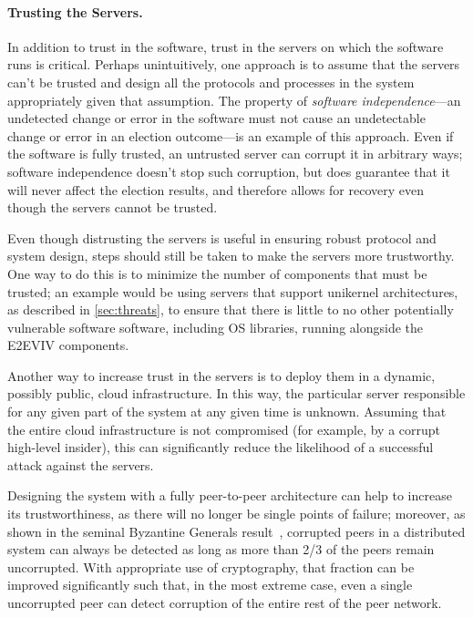 \paragraph{Trusting the Servers.} In addition to trust in the
software, trust in the servers on which the software runs is
critical. Perhaps unintuitively, one approach is to assume that the
servers can't be trusted and design all the protocols and processes in
the system appropriately given that assumption. The property of
\emph{software independence}---an undetected change or error in the
software must not cause an undetectable change or error in an election
outcome---is an example of this approach. Even if the software is
fully trusted, an untrusted server can corrupt it in arbitrary ways;
software independence doesn't stop such corruption, but does guarantee
that it will never affect the election results, and therefore allows
for recovery even though the servers cannot be trusted.

Even though distrusting the servers is useful in ensuring robust
protocol and system design, steps should still be taken to make the
servers more trustworthy.  One way to do this is to minimize the
number of components that must be trusted; an example would be using
servers that support unikernel architectures, as described in
\autoref{sec:threats}, to ensure that there is little to no other
potentially vulnerable software software, including OS libraries,
running alongside the E2EVIV components.

Another way to increase trust in the servers is to deploy them in a
dynamic, possibly public, cloud infrastructure. In this way, the
particular server responsible for any given part of the system at any
given time is unknown. Assuming that the entire cloud infrastructure
is not compromised (for example, by a corrupt high-level insider),
this can significantly reduce the likelihood of a successful attack
against the servers.

Designing the system with a fully peer-to-peer architecture can help
to increase its trustworthiness, as there will no longer be single
points of failure; moreover, as shown in the seminal Byzantine
Generals result~\cite{Lamport82}, corrupted peers in a distributed
system can always be detected as long as more than 2/3 of the peers
remain uncorrupted. With appropriate use of cryptography, that
fraction can be improved significantly such that, in the most extreme
case, even a single uncorrupted peer can detect corruption of the
entire rest of the peer network.

